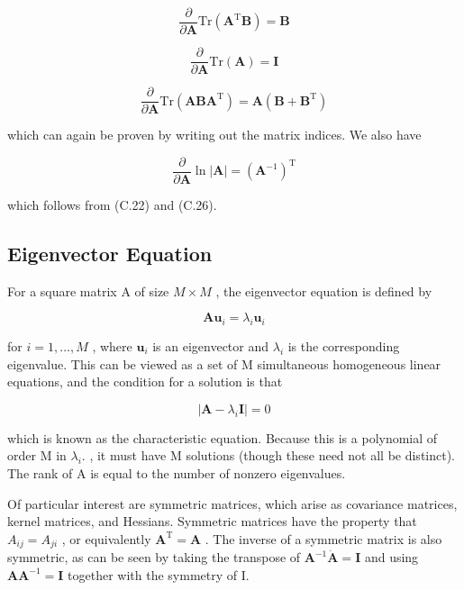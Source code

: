 \documentclass[
  10
]{article}
\begin{document}
\[
\frac {\partial}{\partial \mathbf {A}} \mathrm{Tr} \left(\mathbf {A} ^ {\mathrm{T}} \mathbf {B}\right) = \mathbf {B}\tag{C.25}
\]

\[
{\frac {\partial}{\partial \mathbf {A}} \mathrm{Tr} (\mathbf {A})} = {\mathbf {I}}\tag{C.26}
\]

\[
\frac {\partial}{\partial \mathbf {A}} \mathrm{Tr} (\mathbf {A B A} ^ {\mathrm{T}}) = \mathbf {A} (\mathbf {B} + \mathbf {B} ^ {\mathrm{T}})\tag{C.27}
\]

which can again be proven by writing out the matrix indices. We also
have

\[
\frac {\partial}{\partial \mathbf {A}} \ln | \mathbf {A} | = (\mathbf {A} ^ {- 1}) ^ {\mathrm{T}}\tag{C.28}
\]

which follows from (C.22) and (C.26).

\subsection{Eigenvector Equation}\label{eigenvector-equation}

For a square matrix A of size \(M \times M\) , the eigenvector equation
is defined by

\[
\mathbf {A} \mathbf {u} _ {i} = \lambda_ {i} \mathbf {u} _ {i}\tag{C.29}
\]

for \(i = 1 , \ldots , M\) , where \(\mathbf { u } _ { i }\) is an
eigenvector and \(\lambda _ { i }\) is the corresponding eigenvalue.
This can be viewed as a set of M simultaneous homogeneous linear
equations, and the condition for a solution is that

\[
| \mathbf {A} - \lambda_ {i} \mathbf {I} | = 0\tag{C.30}
\]

which is known as the characteristic equation. Because this is a
polynomial of order M in \(\lambda _ { i } .\) , it must have M
solutions (though these need not all be distinct). The rank of A is
equal to the number of nonzero eigenvalues.

Of particular interest are symmetric matrices, which arise as covariance
matrices, kernel matrices, and Hessians. Symmetric matrices have the
property that \(A _ { i j } = A _ { j i }\) , or equivalently
\(\mathbf { A } ^ { \mathrm { T } } = \mathbf { A }\) . The inverse of a
symmetric matrix is also symmetric, as can be seen by taking the
transpose of
\(\mathbf { A } ^ { - 1 } \dot { \mathbf { A } } = \mathbf { I }\) and
using \(\mathbf { A } \mathbf { A } ^ { - 1 } = \mathbf { I }\) together
with the symmetry of I.
\end{document}
